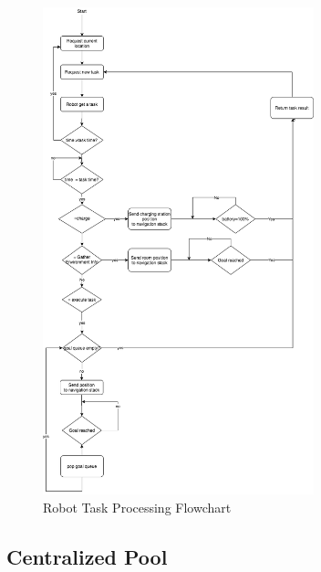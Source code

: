 \begin{figure}[htbp]
    \centering
    \includegraphics[width = 0.7\textwidth]{content/images/ch4/robot_task_flow.drawio.png}
    \caption{Robot Task Processing Flowchart}
    \label{fig:robot_task_processing}
\end{figure}


\subsection{Centralized Pool}



